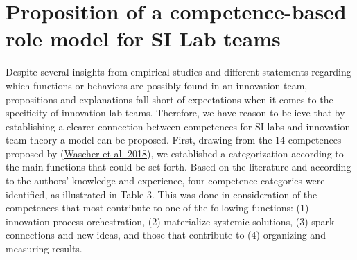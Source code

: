 \documentclass[AMA,STIX1COL,APA,STIX2COL]{WileyNJD-v2}
\begin{document}
\hypertarget{proposition-of-a-competence-based-role-model-for-si-lab-teams}{%
\section{Proposition of a competence-based role model for SI Lab
teams}\label{proposition-of-a-competence-based-role-model-for-si-lab-teams}}

Despite several insights from empirical studies and different statements
regarding which functions or behaviors are possibly found in an
innovation team, propositions and explanations fall short of
expectations when it comes to the specificity of innovation lab teams.
Therefore, we have reason to believe that by establishing a clearer
connection between competences for SI labs and innovation team theory a
model can be proposed. First, drawing from the 14 competences proposed
by (\protect\hyperlink{ref-Wascher2018}{Wascher et al. 2018}), we
established a categorization according to the main functions that could
be set forth. Based on the literature and according to the authors'
knowledge and experience, four competence categories were identified, as
illustrated in Table 3. This was done in consideration of the
competences that most contribute to one of the following functions: (1)
innovation process orchestration, (2) materialize systemic solutions,
(3) spark connections and new ideas, and those that contribute to (4)
organizing and measuring results.

\providecommand{\docline}[3]{\noalign{\global\setlength{\arrayrulewidth}{#1}}\arrayrulecolor[HTML]{#2}\cline{#3}}

\setlength{\tabcolsep}{2pt}

\renewcommand*{\arraystretch}{1.5}
\end{document}
